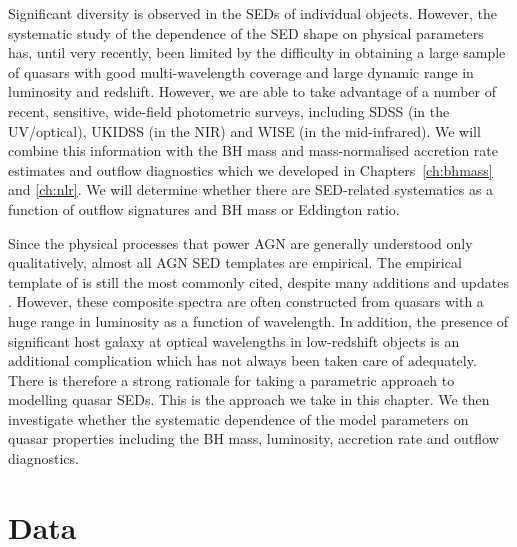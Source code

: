 Significant diversity is observed in the \ac{SED}s of individual objects. 
However, the systematic study of the dependence of the \ac{SED} shape on physical parameters has, until very recently, been limited by the difficulty in obtaining a large sample of quasars with good multi-wavelength coverage and large dynamic range in luminosity and redshift. 
However, we are able to take advantage of a number of recent, sensitive, wide-field photometric surveys, including SDSS (in the UV/optical), UKIDSS (in the \ac{NIR}) and WISE (in the mid-infrared).
We will combine this information with the \ac{BH} mass and mass-normalised accretion rate estimates and outflow diagnostics which we developed in Chapters~\ref{ch:bhmass} and \ref{ch:nlr}. 
We will determine whether there are \ac{SED}-related systematics as a function of outflow signatures and \ac{BH} mass or Eddington ratio. 

Since the physical processes that power \ac{AGN} are generally understood only qualitatively, almost all \ac{AGN} \ac{SED} templates are empirical. 
The empirical template of \citet{elvis94} is still the most commonly cited, despite many additions and updates \citep[e.g.][]{polletta00, kuraszkiewicz03, risaliti04, richards06,  polletta07, lusso10, shang11, marchese12, trichas12}. 
However, these composite spectra are often constructed from quasars with a huge range in luminosity as a function of wavelength. 
In addition, the presence of significant host galaxy at optical wavelengths in low-redshift objects is an additional complication which has not always been taken care of adequately. 
There is therefore a strong rationale for taking a parametric approach to modelling quasar \ac{SED}s. 
This is the approach we take in this chapter. 
We then investigate whether the systematic dependence of the model parameters on quasar properties including the BH mass, luminosity, accretion rate and outflow diagnostics. 

\section{Data}

